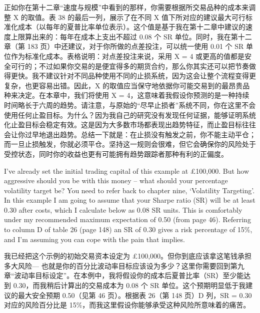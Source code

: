 \begin{chineseblock}正如你在第十二章“速度与规模”中看到的那样，你需要根据所交易品种的成本来调整 X 的取值。表 38 的最后一列，展示了在不同 X 值下所对应的建议最大可行标准化成本（以每年的夏普比率单位表示）。这个值是基于我在第十二章中建议的速度上限算出来的：每年在成本上支出不超过 0.08 个 SR 单位。同时，我在第十二章（第 183 页）中还建议，对于你所做的点差投注，可以统一使用 0.01 个 SR 单位作为标准化成本。表格说明：对点差投注来说，采用 X = 4 或更高的值都是安全可行的；不过如果你交易的是便宜得多的期货合约，那么你其实还可以把节奏做得更快。我不建议针对不同品种使用不同的止损系统，因为这会让整个流程变得更复杂，也更容易出错。因此，X 的取值应当保守地依据你可能交易到的最昂贵品种来决定。在本章中，我们将使用 X = 4，这意味着我假设你预测的是一种持续时间略长于六周的趋势。请注意，与原始的“尽早止损者”系统不同，你在这里不会使用任何止盈目标。为什么？因为我自己的研究没有发现任何证据，能够证明系统化止盈目标会稳定有效。这是因为大多数市场都表现出趋势特征，而止盈目标往往会让你过早地退出趋势。总结一下就是：在止损没有触发之前，你不能主动平仓；而一旦止损触发，你就必须平仓。坚持这一规则会很难，但它会确保你的风险处于受控状态，同时你的收益也更有可能拥有趋势跟踪者那种有利的正偏度。\end{chineseblock}


\begin{englishblock} I've already set the initial trading capital of this example at £100,000. But how aggressive should you be with this money -- what should your percentage volatility target be? You need to refer back to chapter nine, ‘Volatility Targeting'. In this example I am going to assume that your Sharpe ratio (SR) will be at least 0.30 after costs, which I calculate below as 0.08 SR units. This is comfortably under my recommended maximum expectation of 0.50 (from page 46). Referring to column D of table 26 (page 148) an SR of 0.30 gives a risk percentage of 15\%, and I'm assuming you can cope with the pain that implies. \end{englishblock}

\begin{chineseblock}我已经把这个示例的初始交易资本设定为 £100,000。但你到底应该拿这笔钱承担多大风险--- 也就是你的百分比波动率目标应该设为多少？这里你需要回到第九章“波动率目标设定”。在本例中，我将假设你的成本后夏普比率（SR）至少能达到 0.30，而我稍后计算出的交易成本为 0.08 个 SR 单位。这个预期明显低于我建议的最大安全预期 0.50（见第 46 页）。根据表 26（第 148 页）D 列，SR = 0.30 对应的风险百分比是 15\%，而我这里假设你能够承受这种风险所意味着的痛苦。\end{chineseblock}

